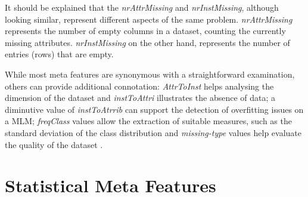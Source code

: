 It should be explained that the \textit{nrAttrMissing} and \textit{nrInstMissing}, although looking similar, represent different aspects of the same problem. \textit{nrAttrMissing} represents the number of empty columns in a dataset, counting the currently missing attributes. \textit{nrInstMissing} on the other hand, represents the number of entries (rows) that are empty.

While most meta features are synonymous with a straightforward examination, others can provide additional connotation: \textit{AttrToInst} helps analysing the dimension of the dataset and \textit{instToAttri} illustrates the absence of data; a diminutive value of \textit{instToAtrrib} can support the detection of overfitting issues on a MLM; \textit{freqClass} values allow the extraction of suitable measures, such as the standard deviation of the class distribution and \textit{missing-type} values help evaluate the quality of the dataset \citep{lindner1999ast}.

\section{Statistical Meta Features}

